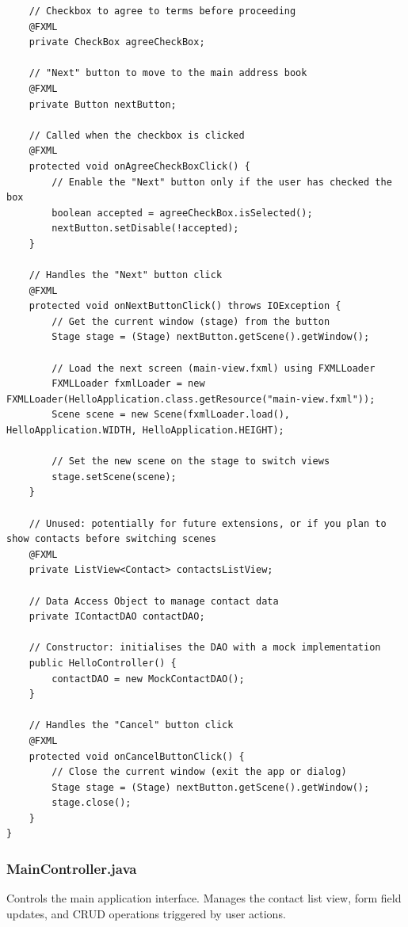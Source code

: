 \documentclass{article}
\begin{document}
\begin{verbatim}
    // Checkbox to agree to terms before proceeding
    @FXML
    private CheckBox agreeCheckBox;

    // "Next" button to move to the main address book
    @FXML
    private Button nextButton;

    // Called when the checkbox is clicked
    @FXML
    protected void onAgreeCheckBoxClick() {
        // Enable the "Next" button only if the user has checked the box
        boolean accepted = agreeCheckBox.isSelected();
        nextButton.setDisable(!accepted);
    }

    // Handles the "Next" button click
    @FXML
    protected void onNextButtonClick() throws IOException {
        // Get the current window (stage) from the button
        Stage stage = (Stage) nextButton.getScene().getWindow();

        // Load the next screen (main-view.fxml) using FXMLLoader
        FXMLLoader fxmlLoader = new FXMLLoader(HelloApplication.class.getResource("main-view.fxml"));
        Scene scene = new Scene(fxmlLoader.load(), HelloApplication.WIDTH, HelloApplication.HEIGHT);

        // Set the new scene on the stage to switch views
        stage.setScene(scene);
    }

    // Unused: potentially for future extensions, or if you plan to show contacts before switching scenes
    @FXML
    private ListView<Contact> contactsListView;

    // Data Access Object to manage contact data
    private IContactDAO contactDAO;

    // Constructor: initialises the DAO with a mock implementation
    public HelloController() {
        contactDAO = new MockContactDAO();
    }

    // Handles the "Cancel" button click
    @FXML
    protected void onCancelButtonClick() {
        // Close the current window (exit the app or dialog)
        Stage stage = (Stage) nextButton.getScene().getWindow();
        stage.close();
    }
}
\end{verbatim}

\subsubsection*{MainController.java}
Controls the main application interface. Manages the contact list view, form field updates, and CRUD operations triggered by user actions.
\end{document}
